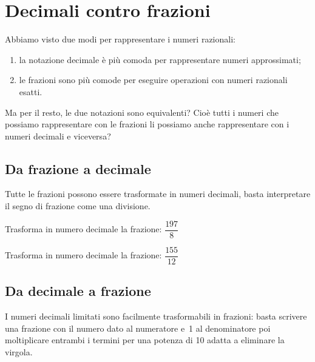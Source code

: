 \section{Decimali contro frazioni}
\label{sec:razionali_decimali_frazioni}

Abbiamo visto due modi per rappresentare i numeri razionali:
\begin{enumerate}
 \item la notazione decimale è più comoda per rappresentare numeri 
approssimati;
 \item le frazioni sono più comode per eseguire operazioni con 
numeri razionali esatti.
\end{enumerate}

Ma per il resto, le due notazioni sono equivalenti? Cioè tutti i numeri che 
possiamo rappresentare con le frazioni li possiamo anche rappresentare con 
i numeri decimali e viceversa?

\subsection{Da frazione a decimale}

Tutte le frazioni possono essere trasformate in numeri decimali, basta 
interpretare il segno di frazione come una divisione.

\begin{esempio}{}{}
Trasforma in numero decimale la frazione: \(\dfrac{197}{8}\)
\begin{center}
 \begin{center}
\frazdeca
%  
 \end{center}
\end{center}
\end{esempio}

\begin{esempio}{}{}
Trasforma in numero decimale la frazione: \(\dfrac{155}{12}\)
\begin{center}
 \begin{center}
\frazdecb
%  
 \end{center}
\end{center}
\end{esempio}

\subsection{Da decimale a frazione}

I numeri decimali limitati sono facilmente trasformabili in frazioni: basta 
scrivere una frazione con il numero dato al numeratore e~1 al denominatore 
poi moltiplicare entrambi i termini per una potenza di 10 adatta a 
eliminare la virgola.

